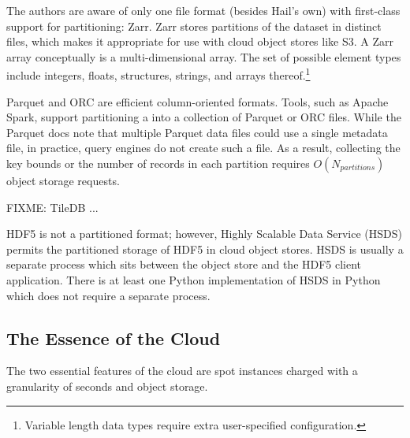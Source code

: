\documentclass[10pt,a4paper%
]{article}
\begin{document}
The authors are aware of only one file format (besides Hail's own) with first-class support for
partitioning: Zarr. Zarr stores partitions of the dataset in distinct files, which makes it
appropriate for use with cloud object stores like S3. A Zarr array conceptually is a
multi-dimensional array. The set of possible element types include integers, floats, structures,
strings, and arrays thereof.\footnote{Variable length data types require extra user-specified
configuration.}

Parquet and ORC are efficient column-oriented formats. Tools, such as Apache Spark, support
partitioning a into a collection of Parquet or ORC files. While the Parquet docs note that multiple
Parquet data files could use a single metadata file, in practice, query engines do not create such a
file. As a result, collecting the key bounds or the number of records in each partition requires
$O(N_{partitions})$ object storage requests.

FIXME: TileDB ...

HDF5 is not a partitioned format; however, Highly Scalable Data Service (HSDS) permits the
partitioned storage of HDF5 in cloud object stores. HSDS is usually a separate process which sits
between the object store and the HDF5 client application. There is at least one Python
implementation of HSDS in Python which does not require a separate process.

\subsection{The Essence of the Cloud}

The two essential features of the cloud are spot instances charged with a granularity of seconds and
object storage.










\end{document}
